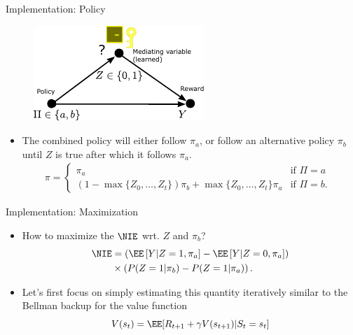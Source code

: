 \begin{frame}{Implementation: Policy}
\begin{figure}
	\centering
	\includegraphics[width=0.7\linewidth]{causal_figures/medanal2}
\end{figure}

	\begin{itemize}
	\item The combined policy will either follow $\pi_a$, or follow an alternative policy $\pi_b$ until $Z$ is true after which it follows $\pi_a$. 
\begin{align*}
	\pi = \begin{cases} \pi_a & \mbox{if $\Pi = a$ } \\ \left(1-\max\{Z_{0}, \dots, Z_t\} \right)\pi_b +\max\{Z_{0}, \dots, Z_t\} \pi_a
		& \mbox{if $\Pi = b$. }\end{cases} %
\end{align*}
	\end{itemize}	
\end{frame}

\begin{frame}{Implementation: Maximization}
\begin{itemize}
	\item How to maximize the $\NIE$ wrt. $Z$ and $\pi_b$?
	\begin{align*}
		\NIE & = \left( \EE\left[Y | Z=1, \pi_a \right] - \EE\left[Y | Z=0, \pi_a \right] \right)  \\  
		& \times  \left( P(Z=1| \pi_b) -P(Z=1| \pi_a) \right).%
	\end{align*} \pause
\item Let's first focus on simply estimating this quantity iteratively similar to the Bellman backup for the value function
$$
V(s_{t} ) = \EE[ R_{t+1} + \gamma V(s_{t+1}) | S_t=s_t]
$$
\end{itemize}
\end{frame}

